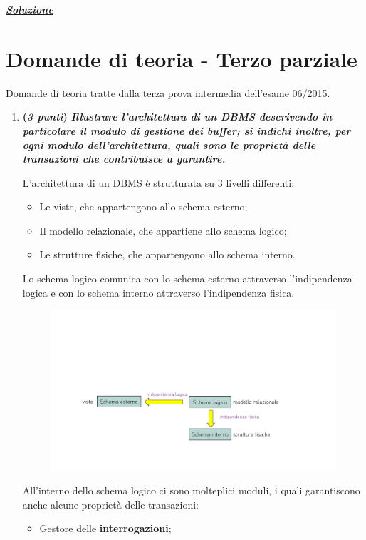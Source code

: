 \documentclass[a4paper]{article}
\begin{document}
	\noindent
	\textcolor{Green4}{\underline{\textbf{\emph{Soluzione}}}}
	\newpage

	\section{Domande di teoria - Terzo parziale}
	
	Domande di teoria tratte dalla terza prova intermedia dell'esame 06/2015.
	\begin{enumerate}
		\item \textbf{(\emph{3 punti})} \textcolor{Green4}{\textbf{\emph{Illustrare l'architettura di un DBMS descrivendo in particolare il modulo di gestione dei buffer; si indichi inoltre, per ogni modulo dell'architettura, quali sono le proprietà delle transazioni che contribuisce a garantire.}}}\label{dom: gestione del buffer}
		
		L'architettura di un DBMS è strutturata su 3 livelli differenti:
		\begin{itemize}
			\item Le viste, che appartengono allo schema esterno;
			\item Il modello relazionale, che appartiene allo schema logico;
			\item Le strutture fisiche, che appartengono allo schema interno.
		\end{itemize}
		Lo schema logico comunica con lo schema esterno attraverso l'indipendenza logica e con lo schema interno attraverso l'indipendenza fisica.
		\begin{figure}[!htp]
			\centering
			\includegraphics[width=\textwidth]{img/ex/arch-dbms-1.pdf}
		\end{figure}
		
		\noindent
		All'interno dello schema logico ci sono molteplici moduli, i quali garantiscono anche alcune proprietà delle transazioni:
		\begin{itemize}
			\item Gestore delle \textbf{interrogazioni};
			

\end{itemize}
\end{enumerate}
\end{document}
